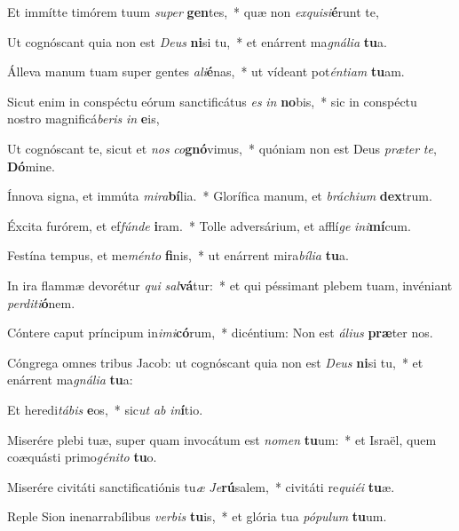 \item Et immítte timórem tuum \textit{su}\textit{per} \textbf{gen}tes,~* quæ non \textit{ex}\textit{qui}\textit{si}\textbf{é}runt te,
\item Ut cognóscant quia non est \textit{De}\textit{us} \textbf{ni}si tu,~* et enárrent ma\textit{gná}\textit{li}\textit{a} \textbf{tu}a.
\item Álleva manum tuam super gentes \textit{a}\textit{li}\textbf{é}nas,~* ut vídeant pot\textit{én}\textit{ti}\textit{am} \textbf{tu}am.
\item Sicut enim in conspéctu eórum sanctificátus \textit{es} \textit{in} \textbf{no}bis,~* sic in conspéctu nostro magnificá\textit{be}\textit{ris} \textit{in} \textbf{e}is,
\item Ut cognóscant te, sicut et \textit{nos} \textit{co}\textbf{gnó}vimus,~* quóniam non est Deus \textit{præ}\textit{ter} \textit{te}, \textbf{Dó}mine.
\item Ínnova signa, et immúta \textit{mi}\textit{ra}\textbf{bí}lia.~* Glorífica manum, et \textit{brá}\textit{chi}\textit{um} \textbf{dex}trum.
\item Éxcita furórem, et ef\textit{fún}\textit{de} \textbf{i}ram.~* Tolle adversárium, et afflí\textit{ge} \textit{in}\textit{i}\textbf{mí}cum.
\item Festína tempus, et me\textit{mén}\textit{to} \textbf{fi}nis,~* ut enárrent mira\textit{bí}\textit{li}\textit{a} \textbf{tu}a.
\item In ira flammæ devorétur \textit{qui} \textit{sal}\textbf{vá}tur:~* et qui péssimant plebem tuam, invéniant \textit{per}\textit{di}\textit{ti}\textbf{ó}nem.
\item Cóntere caput príncipum in\textit{i}\textit{mi}\textbf{có}rum,~* dicéntium: Non est \textit{á}\textit{li}\textit{us} \textbf{præ}ter nos.
\item Cóngrega omnes tribus Jacob: ut cognóscant quia non est \textit{De}\textit{us} \textbf{ni}si tu,~* et enárrent ma\textit{gná}\textit{li}\textit{a} \textbf{tu}a:
\item Et heredi\textit{tá}\textit{bis} \textbf{e}os,~* sic\textit{ut} \textit{ab} \textit{in}\textbf{í}tio.
\item Miserére plebi tuæ, super quam invocátum est \textit{no}\textit{men} \textbf{tu}um:~* et Israël, quem coæquásti primo\textit{gé}\textit{ni}\textit{to} \textbf{tu}o.
\item Miserére civitáti sanctificatiónis tu\textit{æ} \textit{Je}\textbf{rú}salem,~* civitáti re\textit{qui}\textit{é}\textit{i} \textbf{tu}æ.
\item Reple Sion inenarrabílibus \textit{ver}\textit{bis} \textbf{tu}is,~* et glória tua \textit{pó}\textit{pu}\textit{lum} \textbf{tu}um.
